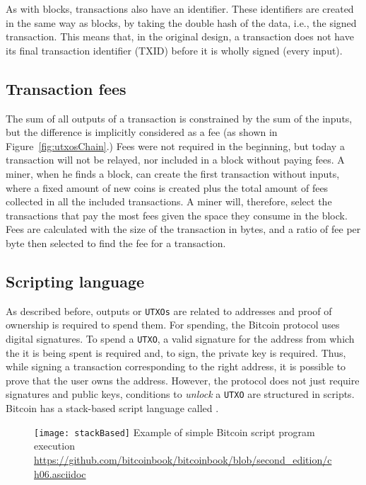As with blocks, transactions also have an identifier. These identifiers are created in the
same way as blocks, by taking the double hash of the data, i.e., the signed
transaction. This means that, in the original design, a transaction does not
have its final transaction identifier (TXID) before it is wholly signed (every
input).

\subsection{Transaction fees}

The sum of all outputs of a transaction is constrained by the sum of the
inputs, but the difference is implicitly considered as a fee (as
shown in Figure~\ref{fig:utxosChain}.) Fees were not required in the beginning, but
today a transaction will not be relayed, nor included in a block without paying fees. A
miner, when he finds a block, can create the first transaction without inputs,
where a fixed amount of new coins is created plus the total amount of fees
collected in all the included transactions. A miner will, therefore, select the
transactions that pay the most fees given the space they consume in the block. Fees are calculated with the size of the transaction in bytes,
and a ratio of fee per byte then selected to find the fee for a transaction.

\subsection{Scripting language}

As described before, outputs or \texttt{UTXOs} are related to addresses and
proof of ownership is required to spend them. For spending, the
Bitcoin protocol uses digital signatures. To spend a \texttt{UTXO}, a valid
signature for the address from which the it is being spent is required and, to sign, the private key is required. Thus, while signing a transaction
corresponding to the right address, it is possible to prove that the user owns
the address. However, the protocol does not just require signatures and public
keys, conditions to \textit{unlock} a \texttt{UTXO} are structured in scripts.
Bitcoin has a stack-based script language called .

\begin{figure}[H]
	\centering
	\texttt{[image: stackBased]}
  {Example of simple Bitcoin script program execution}
	{\url{https://github.com/bitcoinbook/bitcoinbook/blob/second_edition/ch06.asciidoc}}
	\label{fig:stackBased}
\end{figure}

